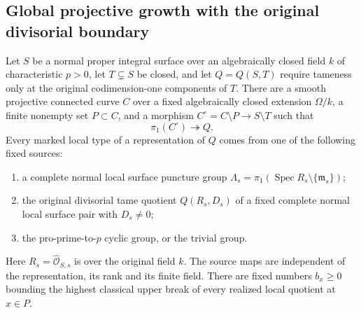 \subsection{Global projective growth with the original divisorial boundary}

\begin{lemma}
\label{D:tame-detecting-curve-local-pairs}
Let $S$ be a normal proper integral surface over an algebraically
closed field $k$ of characteristic $p>0$, let $T\subsetneq S$ be
closed, and let $Q=Q(S,T)$ require tameness only at the original
codimension-one components of $T$. There are a smooth projective
connected curve $C$ over a fixed algebraically closed extension
$\Omega/k$, a finite nonempty set $P\subset C$, and a morphism
$C^\circ=C\setminus P\to S\setminus T$ such that
\[
                      \pi_1(C^\circ)\twoheadrightarrow Q.
                                                        \tag{D.GTP.1}
\]
Every marked local type of a representation of $Q$ comes from
one of the following fixed sources:
\begin{enumerate}
\item a complete normal local surface puncture group
$\Lambda_s=\pi_1(\operatorname{Spec}R_s\setminus\{\mathfrak m_s\})$;
\item the original divisorial tame quotient $Q(R_s,D_s)$ of a
fixed complete normal local surface pair with $D_s\ne0$;
\item the pro-prime-to-$p$ cyclic group, or the trivial group.
\end{enumerate}
Here $R_s=\widehat{\mathcal O}_{S,s}$ is over the original field
$k$. The source maps are independent of the representation, its
rank and its finite field. There are fixed numbers $b_x\ge0$
bounding the highest classical upper break of every realized
local quotient at $x\in P$.
\end{lemma}

